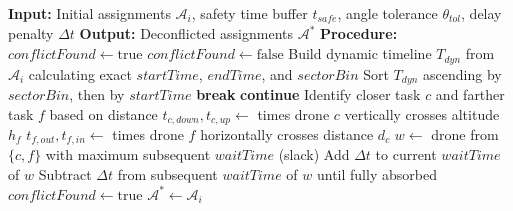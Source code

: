 \documentclass[subscriptcorrection,upint,nolists, varvw,barcolor=Goldenrod3,mathalfa=cal=euler,balance,hyphenate,french]{asmejour} %
\begin{document}
\begin{algorithm}[H]
\caption{Conflict Resolution via Slack Absorption}
\begin{algorithmic}[1]
\STATE \textbf{Input:} Initial assignments $\mathcal{A}_i$, safety time buffer $t_{\mathit{safe}}$, angle tolerance $\theta_{\mathit{tol}}$, delay penalty $\Delta t$
\STATE \textbf{Output:} Deconflicted assignments $\mathcal{A}^\ast$
\STATE \textbf{Procedure:}
\STATE $\mathit{conflictFound} \gets \text{true}$
    \STATE $\mathit{conflictFound} \gets \text{false}$
    \STATE Build dynamic timeline $T_{\mathit{dyn}}$ from $\mathcal{A}_i$ calculating exact $\mathit{startTime}$, $\mathit{endTime}$, and $\mathit{sectorBin}$
    \STATE Sort $T_{\mathit{dyn}}$ ascending by $\mathit{sectorBin}$, then by $\mathit{startTime}$
            \STATE \textbf{break} 
        \ENDIF
            \STATE \textbf{continue} 
        \ENDIF
        \STATE Identify closer task $c$ and farther task $f$ based on distance
            \STATE $t_{c, \mathit{down}}, t_{c, \mathit{up}} \gets$ times drone $c$ vertically crosses altitude $h_f$
            \STATE $t_{f, \mathit{out}}, t_{f, \mathit{in}} \gets$ times drone $f$ horizontally crosses distance $d_c$
                \STATE $w \gets$ drone from $\{c, f\}$ with maximum subsequent $\mathit{waitTime}$ (slack)
                \STATE Add $\Delta t$ to current $\mathit{waitTime}$ of $w$
                \STATE Subtract $\Delta t$ from subsequent $\mathit{waitTime}$ of $w$ until fully absorbed
                \STATE $\mathit{conflictFound} \gets \text{true}$
            \ENDIF
        \ENDIF
    \ENDFOR
\ENDWHILE
\STATE $\mathcal{A}^\ast \gets \mathcal{A}_i$
\end{algorithmic}
\label{alg:ConflictRes}
\end{algorithm}




\end{document}
